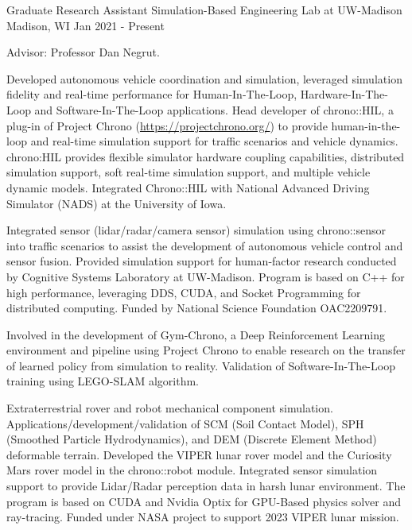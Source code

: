 \begin{cventries}
  \cventry
	{Graduate Research Assistant} %
	{Simulation-Based Engineering Lab at UW-Madison} %
	{Madison, WI} %
	{Jan 2021 - Present} %
	{
		\begin{cvitems} %
			\item {Advisor: Professor Dan Negrut.}
			\item {Developed autonomous vehicle coordination and simulation, leveraged simulation fidelity and real-time performance for Human-In-The-Loop, Hardware-In-The-Loop and Software-In-The-Loop applications. Head developer of chrono::HIL, a plug-in of Project Chrono (\url{https://projectchrono.org/}) to provide human-in-the-loop and real-time simulation support for traffic scenarios and vehicle dynamics. chrono:HIL provides flexible simulator hardware coupling capabilities, distributed simulation support, soft real-time simulation support, and multiple vehicle dynamic models. Integrated Chrono::HIL with National Advanced Driving Simulator (NADS) at the University of Iowa.} 
			\item {Integrated sensor (lidar/radar/camera sensor) simulation using chrono::sensor into traffic scenarios to assist the development of autonomous vehicle control and sensor fusion. Provided simulation support for human-factor research conducted by Cognitive Systems Laboratory at UW-Madison. Program is based on C++ for high performance, leveraging DDS, CUDA, and Socket Programming for distributed computing. Funded by National Science Foundation OAC2209791.}
			\item {Involved in the development of Gym-Chrono, a Deep Reinforcement Learning environment and pipeline using Project Chrono to enable research on the transfer of learned policy from simulation to reality. Validation of Software-In-The-Loop training using LEGO-SLAM algorithm.}
			\item {Extraterrestrial rover and robot mechanical component simulation. Applications/development/validation of SCM (Soil Contact Model), SPH (Smoothed Particle Hydrodynamics), and DEM (Discrete Element Method) deformable terrain. Developed the VIPER lunar rover model and the Curiosity Mars rover model in the chrono::robot module. Integrated sensor simulation support to provide Lidar/Radar perception data in harsh lunar environment. The program is based on CUDA and Nvidia Optix for GPU-Based physics solver and ray-tracing. Funded under NASA project to support 2023 VIPER lunar mission.}
		\end{cvitems}
	}



\end{cventries}
